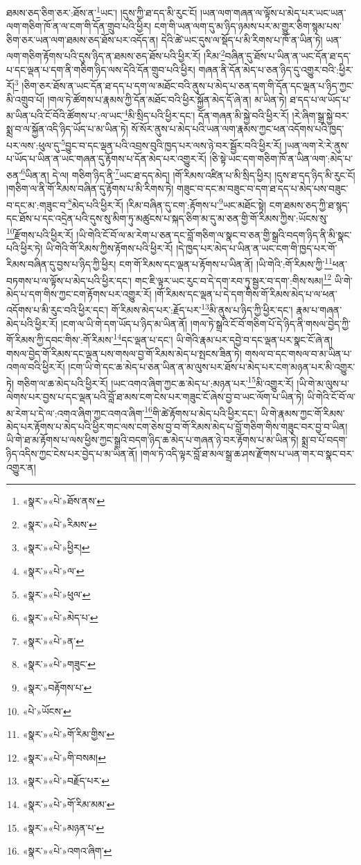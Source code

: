 ཐམས་ཅད་ཅིག་ཅར་:ཐོས་ན་\footnote{«སྣར་»«པེ་»ཐོས་ནས་}ཡང་། །དུས་ཀྱི་ཐ་དད་མི་རུང་ངོ། །ཡན་ལག་གཞན་ལ་ལྟོས་པ་མེད་པར་ཡང་ཡན་ལག་གཅིག་ཁོ་ན་ལ་ངག་གི་དོན་གྲུབ་པའི་ཕྱིར། ངག་གི་ཡན་ལག་དུ་མ་ཉིད་ཉམས་པར་མ་གྱུར་ཅིག་སྙམ་པས་ཅིག་ཅར་ཡན་ལག་ཐམས་ཅད་ཐོས་པར་འདོད་ན། དེའི་ཚེ་ཡང་དུས་ལ་སྡོད་པ་མི་རིགས་པ་ཁོ་ན་ཡིན་ཏེ། ཡན་ལག་གཅིག་རྟོགས་པའི་དུས་ཉིད་ན་ཐམས་ཅད་ཐོས་པའི་ཕྱིར་རོ། །རིམ་\footnote{«སྣར་»«པེ་»རིམས་}བཞིན་དུ་ཐོས་པ་ཡིན་ན་ཡང་དོན་ཐ་དད་པ་དང་ལྡན་པ་དག་ནི་གཅིག་ཉིད་ལས་དེའི་དོན་གྲུབ་པའི་ཕྱིར། གཞན་ནི་དོན་མེད་པ་ཅན་ཉིད་དུ་འགྱུར་བའི་:ཕྱིར་རོ།\footnote{«སྣར་»«པེ་»ཕྱིར།} །ཅིག་ཅར་ཐོས་ན་ཡང་དོན་ཐ་དད་པ་དག་ལ་མཐོང་བའི་ནུས་པ་མེད་པ་ཅན་དག་གི་དོན་དང་ལྡན་པ་ཉིད་ཀྱང་མི་འགྲུབ་པོ། །གལ་ཏེ་ཚོགས་པ་རྣམས་ཀྱི་དོན་མཐོང་བའི་ཕྱིར་སྐྱོན་མེད་དོ་ཞེ་ན། མ་ཡིན་ཏེ། ཐ་དད་པ་ལ་ཡོད་པ་མ་ཡིན་པའི་ངོ་བོའི་ཚོགས་པ་:ལ་ཡང་\footnote{«སྣར་»«པེ་»ལ་}མི་སྲིད་པའི་ཕྱིར་དང་། དོན་གཞན་མི་སྐྱེ་བའི་ཕྱིར་རོ། །རེ་ཞིག་སྒྲ་སྐྱེ་བར་སྨྲ་བ་ལ་སྐྱོན་འདི་ཉིད་ཡོད་པ་མ་ཡིན་ཏེ། སོ་སོར་ནུས་པ་མེད་པའི་ཡན་ལག་རྣམས་ཀྱང་ཕན་འདོགས་པའི་ཁྱད་པར་ལས་:ཕུལ་དུ་\footnote{«སྣར་»«པེ་»ཕུལ་}བྱུང་བ་དང་ལྡན་པའི་འབྲས་བུའི་ཁྱད་པར་ལས་ཉེ་བར་སྦྱོར་བའི་ཕྱིར་རོ། །ཡན་ལག་རེ་རེ་ནུས་པ་ཡོད་པ་ཡིན་ན་ཡང་གཞན་དུ་རྟོགས་པ་དོན་མེད་པར་འགྱུར་རོ། །ཅི་སྟེ་ཡང་དག་གཅིག་ཁོ་ན་ཡིན་ལག་:མེད་པ་ཅན་\footnote{«སྣར་»«པེ་»མེད་པ་}ཡིན་ན། དེ་ལ། གཅིག་ཉིད་ནི་\footnote{«སྣར་»«པེ་»ན་}ཡང་ཐ་དད་མེད། །གོ་རིམས་འཛིན་པ་མི་སྲིད་ཕྱིར། །དུས་ཐ་དད་ཉིད་མི་རུང་ངོ། །གཅིག་ལ་ནི་གོ་རིམས་བཞིན་དུ་རྟོགས་པ་མི་རིགས་ཏེ། གཟུང་བ་དང་མ་བཟུང་བ་དག་ཐ་དད་པ་མེད་པས་བཟུང་བ་དང་མ་:གཟུང་བ་\footnote{«སྣར་»«པེ་»གཟུང་}མེད་པའི་ཕྱིར་རོ། །རིམ་བཞིན་དུ་ངག་:རྟོགས་པ་\footnote{«སྣར་»བརྟོགས་པ་}ཡང་མཐོང་སྟེ། ངག་ཐམས་ཅད་ཀྱི་ཐ་སྙད་དང་ཐོས་པ་དང་འདྲེན་པའི་དུས་སུ་མིག་ཏུ་མཚུངས་པ་སྐད་ཅིག་མ་དུ་མ་ཅན་གྱི་གོ་རིམས་ཀྱིས་:ཡོངས་སུ་\footnote{«པེ་»ཡོངས་}རྫོགས་པའི་ཕྱིར་རོ། །ཡི་གེའི་ངོ་བོ་ལ་མ་རེག་པ་ཅན་དང་བློ་གཅིག་ལ་སྣང་བ་ཅན་གྱི་སྒྲའི་བདག་ཉིད་ནི་མི་སྣང་པའི་ཕྱིར་ཏེ། ཡི་གེའི་གོ་རིམས་ཀྱིས་རྟོགས་པའི་ཕྱིར་རོ། །དེ་ཁྱད་པར་མེད་པ་ཡིན་ན་ཡང་ངག་གི་ཁྱད་པར་གོ་རིམས་བཞིན་དུ་བྱས་པ་ཉིད་ཀྱི་ཕྱིར། ངག་གོ་རིམས་དང་ལྡན་པ་རྟོགས་པ་ཡིན་ནོ། །ཡི་གེའི་:གོ་རིམས་ཀྱི་\footnote{«སྣར་»«པེ་»གོ་རིམ་གྱིས་}ཕན་བཏགས་པ་ལ་ལྟོས་པ་མེད་པའི་ཕྱིར་དང་། གང་ཇི་ལྟར་ཡང་རུང་བ་དེ་དག་རབ་ཏུ་སྦྱར་བ་དག་:གིས་སམ།\footnote{«སྣར་»«པེ་»གི་བསམ།} ཡི་གེ་མེད་པ་དག་གིས་ཀྱང་ངག་རྟོགས་པར་འགྱུར་རོ། །གོ་རིམས་དང་ལྡན་པ་དེ་དག་གིས་གོ་རིམས་མེད་པ་ལ་ཕན་འདོགས་པ་མི་རུང་བའི་ཕྱིར་དང་། གོ་རིམས་མེད་པར་:རྗོད་པར་\footnote{«སྣར་»«པེ་»བརྗོད་པར་}མི་ནུས་པ་ཉིད་ཀྱི་ཕྱིར་དང་། རྣམ་པ་གཞན་མེད་པའི་ཕྱིར་རོ། །ངག་ལ་ཡི་གེ་དག་ཡོད་པ་ཉིད་མ་ཡིན་ནོ། །གལ་ཏེ་སྒྲའི་ངོ་བོ་གཅིག་པོ་དེ་ཉིད་ནི་གསལ་བྱེད་ཀྱི་གོ་རིམས་ཀྱི་དབང་གིས་:གོ་རིམས་\footnote{«སྣར་»«པེ་»གོ་རིམ་མམ་}དང་ལྡན་པ་དང་། ཡི་གེའི་རྣམ་པར་དབྱེ་བ་དང་ལྡན་པར་སྣང་ངོ་ཞེ་ན། གསལ་བྱེད་གོ་རིམས་དང་ལྡན་པས་གསལ་བྱ་གོ་རིམས་མེད་པ་སྤངས་ཟིན་ཏེ། གསལ་བ་དང་གསལ་བ་མ་ཡིན་པ་འགལ་བའི་ཕྱིར་རོ། །ངག་ཡི་གེ་དང་ཆ་མེད་པ་ཅན་ཡིན་ན་མ་ལུས་པར་ཐོས་པ་མེད་པར་ངག་མཉན་པར་མི་འགྱུར་ཏེ། གཅིག་ལ་ཆ་མེད་པའི་ཕྱིར་རོ། །ཡང་འགའ་ཞིག་ཀྱང་ཆ་མེད་པ་:མཉན་པར་\footnote{«སྣར་»«པེ་»མཉན་པ་}མི་འགྱུར་རོ། །ཡི་གེ་མ་ལུས་པ་ལེགས་པར་བྱས་པ་དང་ལྡན་པའི་བློ་ཐ་མས་ངག་ངེས་པར་གཟུང་ངོ་ཞེས་བྱ་བ་ཡང་ལོག་པ་ཡིན་ཏེ། ཡི་གེའི་ངོ་བོ་ལ་མ་རེག་པ་དེ་ལ་:འགའ་ཞིག་ཀྱང་འགའ་ཞིག་\footnote{«སྣར་»«པེ་»འགའ་ཞིག་}གི་ཚེ་རྟོགས་པ་མེད་པའི་ཕྱིར་དང་། ཡི་གེ་རྣམས་ཀྱང་གོ་རིམས་མེད་པར་རྟོགས་པ་མེད་པའི་ཕྱིར་གང་ལས་ངག་ཅེས་བྱ་བ་གོ་རིམས་མེད་པ་བློ་གཅིག་གིས་གཟུང་བར་བྱ་བ་ཡིན། ཡི་གེ་ཐ་མ་རྟོགས་པ་ལས་ཕྱིས་ཀྱང་སྒྲའི་བདག་ཉིད་ཆ་མེད་པ་གཞན་ཉེ་བར་རྟོགས་པ་མ་ཡིན་ཏེ། སྨྲ་བ་པོ་བདག་ཉིད་འདིས་ཀྱང་ངེས་པར་བྱེད་པ་མ་ཡིན་ནོ། །གལ་ཏེ་འདི་ལྟར་བློ་ཐ་མལ་སྒྲ་ཆ་ཤས་རྫོགས་པ་ཡན་གར་བ་སྣང་བར་འགྱུར་ན། 